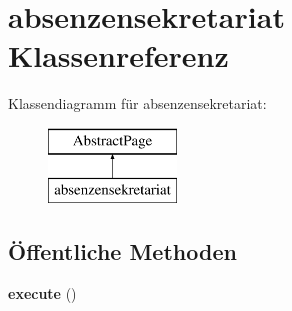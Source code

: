 \hypertarget{classabsenzensekretariat}{}\section{absenzensekretariat Klassenreferenz}
\label{classabsenzensekretariat}
Klassendiagramm für absenzensekretariat\+:\begin{figure}[H]
\begin{center}
\leavevmode
\includegraphics[height=2.000000cm]{classabsenzensekretariat}
\end{center}
\end{figure}
\subsection*{Öffentliche Methoden}
\begin{DoxyCompactItemize}
\item 
\mbox{\label{classabsenzensekretariat_a318c800b160f593523594cd9a27ffc4a}} 
{\bfseries execute} ()
\end{DoxyCompactItemize}
